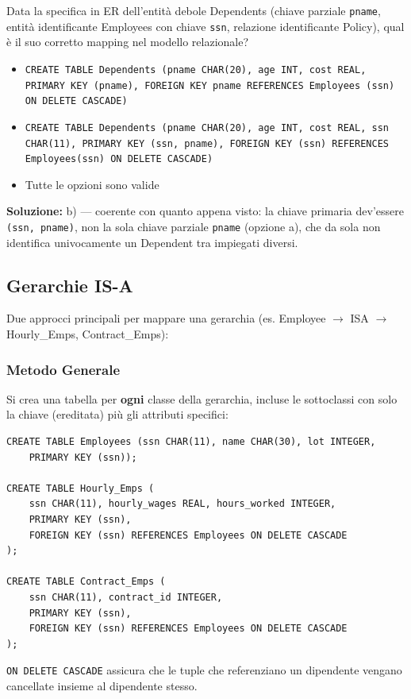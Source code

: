 \documentclass[12pt, a4paper]{article}
\begin{document}
\begin{tcolorbox}[colback=lightergray!10, colframe=tocsec, title=\textbf{Esercizio 2}]
Data la specifica in ER dell'entità debole Dependents (chiave parziale \texttt{pname}, entità identificante Employees con chiave \texttt{ssn}, relazione identificante Policy), qual è il suo corretto mapping nel modello relazionale?
\begin{itemize}
    \item[a)] \texttt{CREATE TABLE Dependents (pname CHAR(20), age INT, cost REAL, PRIMARY KEY (pname), FOREIGN KEY pname REFERENCES Employees (ssn) ON DELETE CASCADE)}
    \item[b)] \texttt{CREATE TABLE Dependents (pname CHAR(20), age INT, cost REAL, ssn CHAR(11), PRIMARY KEY (ssn, pname), FOREIGN KEY (ssn) REFERENCES Employees(ssn) ON DELETE CASCADE)}
    \item[c)] Tutte le opzioni sono valide
\end{itemize}
\end{tcolorbox}
\textbf{Soluzione:} b) — coerente con quanto appena visto: la chiave primaria dev'essere \texttt{(ssn, pname)}, non la sola chiave parziale \texttt{pname} (opzione a), che da sola non identifica univocamente un Dependent tra impiegati diversi.

\subsection{Gerarchie IS-A}

Due approcci principali per mappare una gerarchia (es. Employee $\to$ ISA $\to$ Hourly\_Emps, Contract\_Emps):

\subsubsection{Metodo Generale}
Si crea una tabella per \textbf{ogni} classe della gerarchia, incluse le sottoclassi con solo la chiave (ereditata) più gli attributi specifici:
\begin{verbatim}
CREATE TABLE Employees (ssn CHAR(11), name CHAR(30), lot INTEGER,
    PRIMARY KEY (ssn));

CREATE TABLE Hourly_Emps (
    ssn CHAR(11), hourly_wages REAL, hours_worked INTEGER,
    PRIMARY KEY (ssn),
    FOREIGN KEY (ssn) REFERENCES Employees ON DELETE CASCADE
);

CREATE TABLE Contract_Emps (
    ssn CHAR(11), contract_id INTEGER,
    PRIMARY KEY (ssn),
    FOREIGN KEY (ssn) REFERENCES Employees ON DELETE CASCADE
);
\end{verbatim}
\texttt{ON DELETE CASCADE} assicura che le tuple che referenziano un dipendente vengano cancellate insieme al dipendente stesso.
\end{document}
